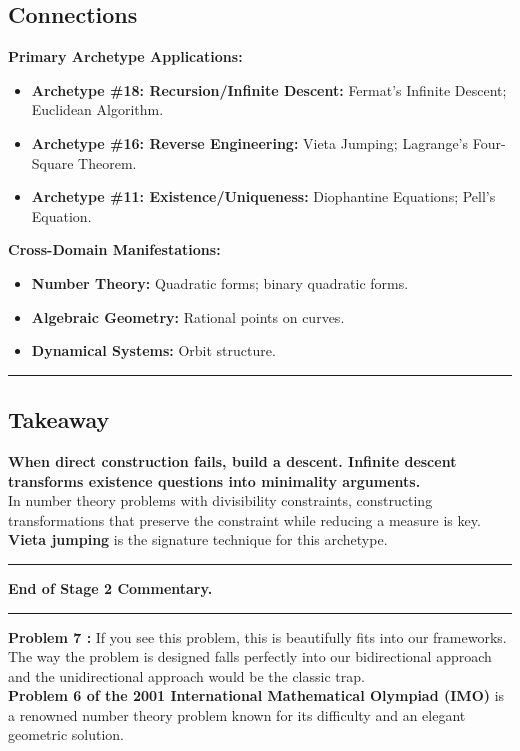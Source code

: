 \documentclass{article}
\begin{document}
\subsection*{Connections}
\textbf{Primary Archetype Applications:}
\begin{itemize}
    \item \textbf{Archetype \#18: Recursion/Infinite Descent:} Fermat's Infinite Descent; Euclidean Algorithm.
    \item \textbf{Archetype \#16: Reverse Engineering:} Vieta Jumping; Lagrange's Four-Square Theorem.
    \item \textbf{Archetype \#11: Existence/Uniqueness:} Diophantine Equations; Pell's Equation.
\end{itemize}
\textbf{Cross-Domain Manifestations:}
\begin{itemize}
    \item \textbf{Number Theory:} Quadratic forms; binary quadratic forms.
    \item \textbf{Algebraic Geometry:} Rational points on curves.
    \item \textbf{Dynamical Systems:} Orbit structure.
\end{itemize}

\noindent \rule{\textwidth}{0.4pt}

\subsection*{Takeaway}
\textbf{When direct construction fails, build a descent. Infinite descent transforms existence questions into minimality arguments.} \\
In number theory problems with divisibility constraints, constructing transformations that preserve the constraint while reducing a measure is key. \textbf{Vieta jumping} is the signature technique for this archetype.

\noindent \rule{\textwidth}{0.4pt}

\noindent \textbf{End of Stage 2 Commentary.}

\noindent \rule{\textwidth}{0.4pt}

\noindent \textbf{Problem 7 :} If you see this problem, this is beautifully fits into our frameworks. The way the problem is designed falls perfectly into our bidirectional approach and the unidirectional approach would be the classic trap. \\

\noindent \textbf{Problem 6 of the 2001 International Mathematical Olympiad (IMO)} is a renowned number theory problem known for its difficulty and an elegant geometric solution. \\
\end{document}
